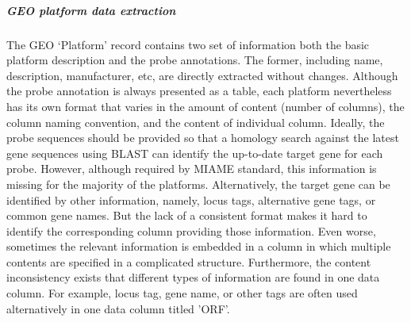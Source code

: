 





\subparagraph{GEO platform data extraction}
%
The GEO `Platform' record contains two set of information both the basic
platform description and the probe annotations.
%
The former, including name, description, manufacturer, etc, are directly
extracted without changes.
%
Although the probe annotation is always presented as a table, each platform
nevertheless has its own format that varies in the amount of content (number
of columns), the column naming convention, and the content of individual
column.
%
Ideally, the probe sequences should be provided so that a homology search
against the latest gene sequences using BLAST \cite{Altschul1997} can identify
the up-to-date target gene for each probe.
%
However, although required by MIAME\cite{Brazma2001} standard, this information
is missing for the majority of the platforms.
%
Alternatively, the target gene can be identified by other information, namely,
locus tags, alternative gene tags, or common gene names.
%
But the lack of a consistent format makes it hard to identify the corresponding
column providing those information.
%
Even worse, sometimes the relevant information is embedded in a column in which
multiple contents are specified in a complicated structure.
%
Furthermore, the content inconsistency exists that different types of
information are found in one data column.
%
For example, locus tag, gene name, or other tags are often used
alternatively in one data column titled 'ORF'.



